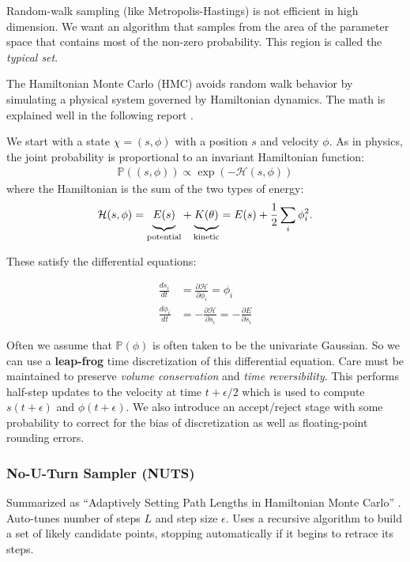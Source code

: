 \documentclass[12pt]{article}
\newcommand{\mystrut}{\ensuremath{\vphantom{\sum}}}
\newcommand{\PP}{\ensuremath{\mathbb{P}}}
\begin{document}
Random-walk sampling (like Metropolis-Hastings) is not efficient in high
dimension. We want an algorithm that samples from the area of the
parameter space that contains most of the non-zero probability. This region is
called the {\sl typical set}.

The Hamiltonian Monte Carlo (HMC) avoids random walk behavior by simulating a
physical system governed by Hamiltonian dynamics. The math is explained well in
the following report \cite{Neal93probabilisticinference}.

We start with a state $\chi = (s,\phi)$ with a position $s$ and velocity $\phi$.
As in physics, the joint probability is proportional to an invariant Hamiltonian
function:
\begin{align*}
  \PP((s,\phi)) \propto \exp( -\mathcal{H}(s,\phi))
\end{align*}
where the Hamiltonian is the sum of the two types of energy:
\begin{align*}
  \mathcal H(s,\phi) = \underbrace{\mystrut E(s)}_{\text{potential}} +
  \underbrace{\mystrut K(\theta)}_{\text{kinetic}} = E(s) + \frac{1}{2} \sum_i \phi_i^2.
\end{align*}

These satisfy the differential equations:

\begin{align*}\frac{ds_i}{dt} &= \frac{\partial \mathcal{H}}{\partial \phi_i} = \phi_i \\
\frac{d\phi_i}{dt} &= - \frac{\partial \mathcal{H}}{\partial s_i}
= - \frac{\partial E}{\partial s_i}
\end{align*}

Often we assume that $\PP(\phi)$ is often taken to be the univariate Gaussian. So
we can use a {\bf leap-frog} time discretization of this differential equation.
Care must be maintained to preserve {\sl volume conservation} and {\sl time
  reversibility}. This performs half-step updates to the velocity at time
$t+\epsilon/2$ which is used to compute $s(t+\epsilon)$ and $\phi(t+\epsilon)$.
We also introduce an accept/reject stage with some probability to correct for
the bias of discretization as well as floating-point rounding errors.

\subsubsection{No-U-Turn Sampler (NUTS)}

Summarized as ``Adaptively Setting Path Lengths in Hamiltonian Monte Carlo''
\cite{DBLP:journals/jmlr/HoffmanG14}. Auto-tunes number of steps $L$ and step
size $\epsilon$. Uses a recursive algorithm to build a set
of likely candidate points, stopping automatically if it begins to retrace its
steps.
\end{document}
